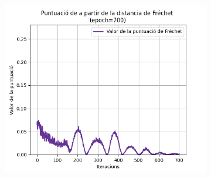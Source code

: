 \begin{figure}
\begin{subfigure}[b]{.32\linewidth}
		\includegraphics[width=\linewidth]{figures/data/FD_score_6.png}
		\caption{}
	\end{subfigure}
	

\end{figure}

